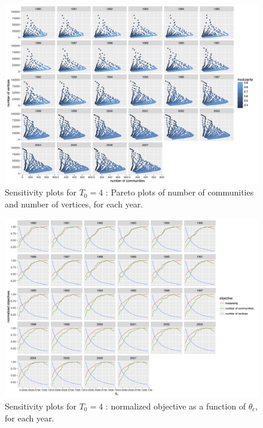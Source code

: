 \begin{figure}
\centering
\includegraphics[width=\textheight,height=\textwidth,angle=90]{figures/vcount_comnum_pareto.png}
\caption{Sensitivity plots for $T_0 = 4$ : Pareto plots of number of communities and number of vertices, for each year.}
\label{fig:ext-sensitivity-2}
\end{figure}

\begin{figure}
\centering
\includegraphics[width=\textheight,height=\textwidth,angle=90]{figures/normalizedObjs-dispth_eth4_1e-5.png}
\caption{Sensitivity plots for $T_0 = 4$ : normalized objective as a function of $\theta_c$, for each year.}
\label{fig:ext-sensitivity-3}
\end{figure}



